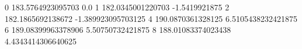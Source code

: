 0 183.5764923095703 0.0
1 182.0345001220703 -1.5419921875
2 182.1865692138672 -1.389923095703125
4 190.0870361328125 6.5105438232421875
6 189.08399963378906 5.50750732421875
8 188.01083374023438 4.4343414306640625
